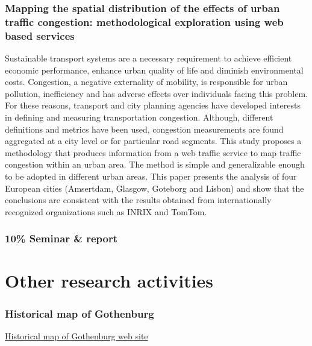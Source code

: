 \subsubsection{Mapping the spatial distribution of the effects of urban traffic congestion: methodological exploration using web based services}
Sustainable transport systems are a necessary requirement to achieve efficient economic performance, enhance urban quality of life and diminish environmental costs. Congestion, a negative externality of mobility, is responsible for urban pollution, inefficiency and has adverse effects over individuals facing this problem. For these reasons, transport and city planning agencies have developed interests in defining and measuring transportation congestion. Although, different definitions and metrics have been used, congestion measurements are found aggregated at a city level or for particular road segments. This study proposes a methodology that produces information from a web traffic service to map traffic congestion within an urban area. The method is simple and generalizable enough to be adopted in different urban areas. This paper presents the analysis of four European cities (Amsertdam, Glasgow, Goteborg and Lisbon) and show that the conclusions are consistent with the results obtained from internationally recognized organizations such as INRIX and TomTom.


\subsubsection{10\% Seminar \& report}









\section{Other research activities}
\subsubsection{Historical map of Gothenburg}
\href{https://chalmers.shinyapps.io/Goteborg_historical/?_ga=2.267750478.1104859035.1597823961-1745043960.1597823961}{Historical map of Gothenburg web site}


